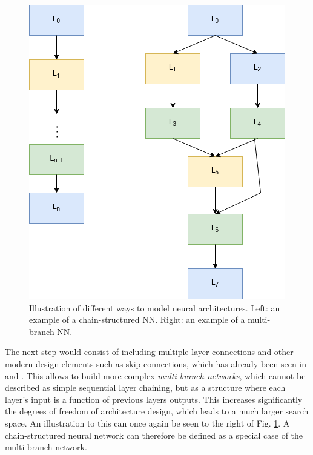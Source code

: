 \documentclass[10pt,        %
               a4paper,     %
               journal,     %
               ]{IEEEtran}
\begin{document}
\begin{figure}[!h]
    \centering
    \includegraphics[scale=0.4]{space}
    \caption{Illustration of different ways to model neural architectures. Left: an example of a chain-structured NN.
             Right: an example of a multi-branch NN.}
    \label{space}
\end{figure}

The next step would consist of including multiple layer connections and other modern design elements such as skip connections, which has already been seen
in \cite{zoph2016neural} and \cite{pmlr-v70-real17a}. This allows to build more complex \textit{multi-branch networks}, which
cannot be described as simple sequential layer chaining, but as a structure where each layer's input is a function of
previous layers outputs. This increases significantly the degrees of freedom of architecture design,
which leads to a much larger search space. An illustration to this can once again be seen to the right of Fig. \ref{space}.
A chain-structured neural network can therefore be defined as a special case of the multi-branch network.
\end{document}
